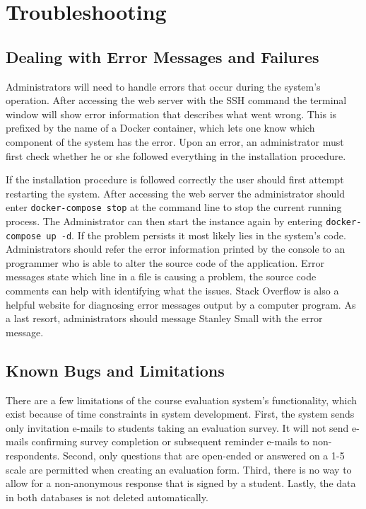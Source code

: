 \documentclass{article}
\begin{document}
\section{Troubleshooting}

\subsection{Dealing with Error Messages and Failures}

Administrators will need to handle errors that occur during the system's operation. After accessing the web server with the SSH command the terminal window will show error information that describes what went wrong. This is prefixed by the name of a Docker container, which lets one know which component of the system has the error. Upon an error, an administrator must first check whether he or she followed everything in the installation procedure.

If the installation procedure is followed correctly the user should first attempt restarting the system.  After accessing the web server the administrator should enter \verb|docker-compose stop| at the command line to stop the current running process.  The Administrator can then start the instance again by entering \verb|docker-compose up -d|.  If the problem persists it most likely lies in the system's code. Administrators should refer the error information printed by the console to an programmer who is able to alter the source code of the application. Error messages state which line in a file is causing a problem, the source code comments can help with identifying what the issues. Stack Overflow is also a helpful website for diagnosing error messages output by a computer program. As a last resort, administrators should message Stanley Small with the error message.

\subsection{Known Bugs and Limitations}

There are a few limitations of the course evaluation system's functionality, which exist because of time constraints in system development. First, the system sends only invitation e-mails to students taking an evaluation survey. It will not send e-mails confirming survey completion or subsequent reminder e-mails to non-respondents. Second, only questions that are open-ended or answered on a 1-5 scale are permitted when creating an evaluation form. Third, there is no way to allow for a non-anonymous response that is signed by a student. Lastly, the data in both databases is not deleted automatically.
\end{document}
